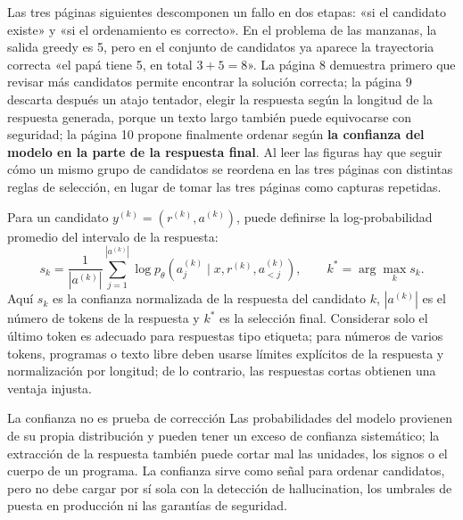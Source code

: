 Las tres páginas siguientes descomponen un fallo en dos etapas: «si el candidato existe» y «si el ordenamiento es correcto». En el problema de las manzanas, la salida greedy es 5, pero en el conjunto de candidatos ya aparece la trayectoria correcta «el papá tiene 5, en total $3+5=8$». La página 8 demuestra primero que revisar más candidatos permite encontrar la solución correcta; la página 9 descarta después un atajo tentador, elegir la respuesta según la longitud de la respuesta generada, porque un texto largo también puede equivocarse con seguridad; la página 10 propone finalmente ordenar según \textbf{la confianza del modelo en la parte de la respuesta final}. Al leer las figuras hay que seguir cómo un mismo grupo de candidatos se reordena en las tres páginas con distintas reglas de selección, en lugar de tomar las tres páginas como capturas repetidas.




Para un candidato $y^{(k)}=(r^{(k)},a^{(k)})$, puede definirse la log-probabilidad promedio del intervalo de la respuesta:
\[
s_k=\frac{1}{|a^{(k)}|}\sum_{j=1}^{|a^{(k)}|}
\log p_\theta\!\left(a^{(k)}_j\mid x,r^{(k)},a^{(k)}_{<j}\right),
\qquad k^*=\arg\max_k s_k.
\]
Aquí $s_k$ es la confianza normalizada de la respuesta del candidato $k$, $|a^{(k)}|$ es el número de tokens de la respuesta y $k^*$ es la selección final. Considerar solo el último token es adecuado para respuestas tipo etiqueta; para números de varios tokens, programas o texto libre deben usarse límites explícitos de la respuesta y normalización por longitud; de lo contrario, las respuestas cortas obtienen una ventaja injusta.

\begin{warningbox}{La confianza no es prueba de corrección}
Las probabilidades del modelo provienen de su propia distribución y pueden tener un exceso de confianza sistemático; la extracción de la respuesta también puede cortar mal las unidades, los signos o el cuerpo de un programa. La confianza sirve como señal para ordenar candidatos, pero no debe cargar por sí sola con la detección de hallucination, los umbrales de puesta en producción ni las garantías de seguridad.
\end{warningbox}

